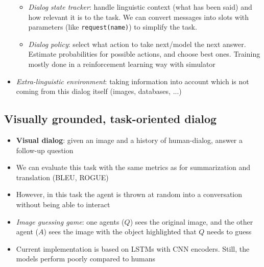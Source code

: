 \begin{itemize}
\begin{itemize}
		\item \textit{Dialog state tracker}: handle linguistic context (what has been said) and how relevant it is to the task. We can convert messages into slots with parameters (like \texttt{request(name)}) to simplify the task. 
		\item \textit{Dialog policy}: select what action to take next/model the next answer. Estimate probabilities for possible actions, and choose best ones. Training mostly done in a reinforcement learning way with simulator
	\end{itemize}
	\item \textit{Extra-linguistic environment}: taking information into account which is not coming from this dialog itself (images, databases, ...)
\end{itemize}
\subsection{Visually grounded, task-oriented dialog}
\begin{itemize}
	\item \textbf{Visual dialog}: given an image and a history of human-dialog, answer a follow-up question 
	\item We can evaluate this task with the same metrics as for summarization and translation (BLEU, ROGUE)
	\item However, in this task the agent is thrown at random into a conversation without being able to interact
	\item \textit{Image guessing game}: one agents ($Q$) sees the original image, and the other agent ($A$) sees the image with the object highlighted that $Q$ needs to guess
	\item Current implementation is based on LSTMs with CNN encoders. Still, the models perform poorly compared to humans
\end{itemize}